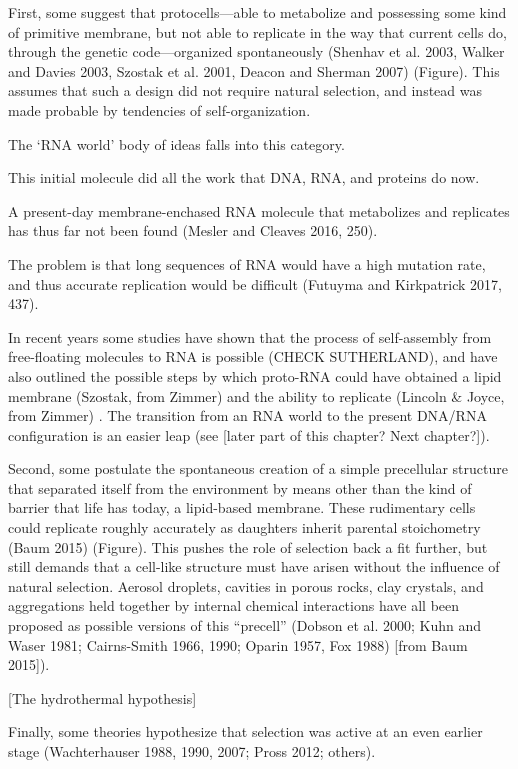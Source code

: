 \documentclass{tufte-book} %
\begin{document}
First, some suggest that protocells—able to metabolize and possessing some kind of primitive membrane, but not able to replicate in the way that current cells do, through the genetic code—organized spontaneously (Shenhav et al. 2003, Walker and Davies 2003, Szostak et al. 2001, Deacon and Sherman 2007) (Figure).  This assumes that such a design did not require natural selection, and instead was made probable by tendencies of self-organization. 

The ‘RNA world’ body of ideas falls into this category.

This initial molecule did all the work that DNA, RNA, and proteins do now. 

A present-day membrane-enchased RNA molecule that metabolizes and replicates has thus far not been found (Mesler and Cleaves 2016, 250). 

The problem is that long sequences of RNA would have a high mutation rate, and thus accurate replication would be difficult (Futuyma and Kirkpatrick 2017, 437). 

In recent years some studies have shown that the process of self-assembly from free-floating molecules to RNA is possible (CHECK SUTHERLAND), and have also outlined the possible steps by which proto-RNA could have obtained a lipid membrane (Szostak, from Zimmer) and the ability to replicate (Lincoln & Joyce, from Zimmer) . The transition from an RNA world to the present DNA/RNA configuration is an easier leap (see [later part of this chapter? Next chapter?]). 

Second, some postulate the spontaneous creation of a simple precellular structure that separated itself from the environment by means other than the kind of barrier that life has today, a lipid-based membrane. These rudimentary cells could replicate roughly accurately as daughters inherit parental stoichometry (Baum 2015) (Figure). This pushes the role of selection back a fit further, but still demands that a cell-like structure must have arisen without the influence of natural selection. Aerosol droplets, cavities in porous rocks, clay crystals, and aggregations held together by internal chemical interactions have all been proposed as possible versions of this “precell” (Dobson et al. 2000; Kuhn and Waser 1981; Cairns-Smith 1966, 1990; Oparin 1957, Fox 1988) [from Baum 2015]). 

[The hydrothermal hypothesis]

Finally, some theories hypothesize that selection was active at an even earlier stage (Wachterhauser 1988, 1990, 2007; Pross 2012; others). 
\end{document}
